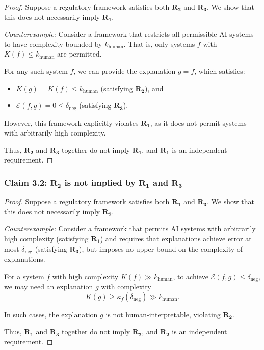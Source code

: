 \documentclass[11pt,letter,leqno]{article}
\begin{document}
\begin{proof}
Suppose a regulatory framework satisfies both $\mathbf{R_2}$ and $\mathbf{R_3}$. We show 
that this does not necessarily imply $\mathbf{R_1}$.

\textit{Counterexample:} Consider a framework that restricts all permissible AI 
systems to have complexity bounded by $k_{\text{human}}$. That is, only systems 
$f$ with $K(f) \leq k_{\text{human}}$ are permitted.

For any such system $f$, we can provide the explanation $g = f$, which satisfies:
\begin{itemize}
\item $K(g) = K(f) \leq k_{\text{human}}$ (satisfying $\mathbf{R_2}$), and
\item $\mathcal{E}(f,g) = 0 \leq \delta_{\text{neg}}$ (satisfying $\mathbf{R_3}$).
\end{itemize}

However, this framework explicitly violates $\mathbf{R_1}$, as it does not permit 
systems with arbitrarily high complexity.

Thus, $\mathbf{R_2}$ and $\mathbf{R_3}$ together do not imply $\mathbf{R_1}$, and 
$\mathbf{R_1}$ is an independent requirement.
\end{proof}

\subsubsection*{Claim 3.2: $\mathbf{R_2}$ is not implied by $\mathbf{R_1}$ and $\mathbf{R_3}$}

\begin{proof}
Suppose a regulatory framework satisfies both $\mathbf{R_1}$ and $\mathbf{R_3}$. We show 
that this does not necessarily imply $\mathbf{R_2}$.

\textit{Counterexample:} Consider a framework that permits AI systems with 
arbitrarily high complexity (satisfying $\mathbf{R_1}$) and requires that explanations 
achieve error at most $\delta_{\text{neg}}$ (satisfying $\mathbf{R_3}$), but imposes 
no upper bound on the complexity of explanations.

For a system $f$ with high complexity $K(f) \gg k_{\text{human}}$, to achieve 
$\mathcal{E}(f,g) \leq \delta_{\text{neg}}$, we may need an explanation $g$ with 
complexity
\[
K(g) \geq \kappa_f(\delta_{\text{neg}}) \gg k_{\text{human}}.
\]

In such cases, the explanation $g$ is not human-interpretable, violating 
$\mathbf{R_2}$.

Thus, $\mathbf{R_1}$ and $\mathbf{R_3}$ together do not imply $\mathbf{R_2}$, and 
$\mathbf{R_2}$ is an independent requirement.
\end{proof}
\end{document}
